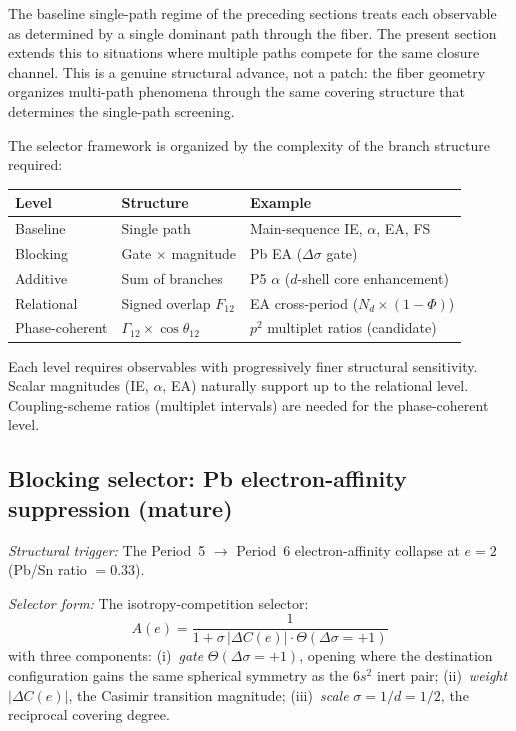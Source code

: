\documentclass[11pt,a4paper]{article}
\begin{document}
The baseline single-path regime of the preceding sections treats each observable as determined by a single dominant path through the fiber. The present section extends this to situations where multiple paths compete for the same closure channel. This is a genuine structural advance, not a patch: the fiber geometry organizes multi-path phenomena through the same covering structure that determines the single-path screening.

The selector framework is organized by the complexity of the branch structure required:

\begin{center}
\renewcommand{\arraystretch}{1.15}
\begin{tabular}{lll}
\toprule
Level & Structure & Example \\
\midrule
Baseline & Single path & Main-sequence IE, $\alpha$, EA, FS \\
Blocking & Gate $\times$ magnitude & Pb EA ($\Delta\sigma$ gate) \\
Additive & Sum of branches & P5 $\alpha$ ($d$-shell core enhancement) \\
Relational & Signed overlap $F_{12}$ & EA cross-period ($N_d \times (1-\Phi)$) \\
Phase-coherent & $\Gamma_{12} \times \cos\theta_{12}$ & $p^2$ multiplet ratios (candidate) \\
\bottomrule
\end{tabular}
\end{center}

Each level requires observables with progressively finer structural sensitivity. Scalar magnitudes (IE, $\alpha$, EA) naturally support up to the relational level. Coupling-scheme ratios (multiplet intervals) are needed for the phase-coherent level.

\subsection{Blocking selector: Pb electron-affinity suppression (mature)}
\label{sec:pb-ea}

\emph{Structural trigger:} The Period~5 $\to$ Period~6 electron-affinity collapse at $e = 2$ (Pb/Sn ratio $= 0.33$).

\emph{Selector form:} The isotropy-competition selector:
\[
A(e) = \frac{1}{1 + \sigma \,|\Delta C(e)| \cdot \Theta(\Delta\sigma = +1)}
\]
with three components: (i)~\emph{gate} $\Theta(\Delta\sigma = +1)$, opening where the destination configuration gains the same spherical symmetry as the $6s^2$ inert pair; (ii)~\emph{weight} $|\Delta C(e)|$, the Casimir transition magnitude; (iii)~\emph{scale} $\sigma = 1/d = 1/2$, the reciprocal covering degree.
\end{document}
